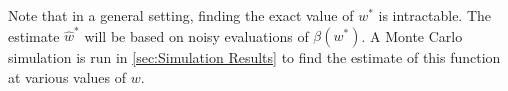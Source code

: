 \documentclass[11pt]{article} %
\begin{document}
Note that in a general setting, finding the exact value of $w^*$ is intractable. The estimate $\hat{w}^*$ will be based on noisy evaluations of $\beta(w^*)$.  A Monte Carlo simulation is run in   \ref{sec:Simulation Results} 
to find the estimate of this function at various values of $w$.

\end{document}
